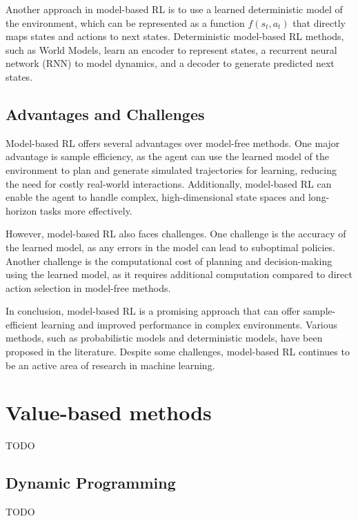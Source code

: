 \documentclass[../chapters.tex]{subfiles}
\begin{document}
    Another approach in model-based RL is to use a learned deterministic model of the environment, which can be represented as a function $f(s_t, a_t)$ that directly maps states and actions to next states.
    Deterministic model-based RL methods, such as World Models, learn an encoder to represent states, a recurrent neural network (RNN) to model dynamics, and a decoder to generate predicted next states.

    \subsection{Advantages and Challenges}

    Model-based RL offers several advantages over model-free methods.
    One major advantage is sample efficiency, as the agent can use the learned model of the environment to plan and generate simulated trajectories for learning, reducing the need for costly real-world interactions.
    Additionally, model-based RL can enable the agent to handle complex, high-dimensional state spaces and long-horizon tasks more effectively.

    However, model-based RL also faces challenges.
    One challenge is the accuracy of the learned model, as any errors in the model can lead to suboptimal policies.
    Another challenge is the computational cost of planning and decision-making using the learned model, as it requires additional computation compared to direct action selection in model-free methods.

    In conclusion, model-based RL is a promising approach that can offer sample-efficient learning and improved performance in complex environments.
    Various methods, such as probabilistic models and deterministic models, have been proposed in the literature.
    Despite some challenges, model-based RL continues to be an active area of research in machine learning.




    \section{Value-based methods}
    TODO

    \subsection{Dynamic Programming}\label{subsec:dynamic-programming}
    TODO
\end{document}
